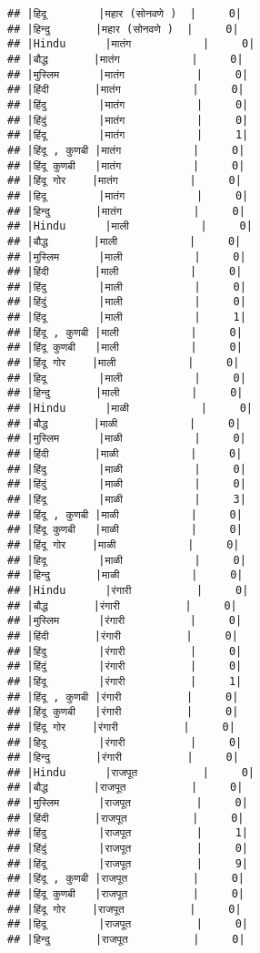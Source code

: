 \documentclass[
]{article}
\begin{document}
\begin{verbatim}
## |हिदू        |महार (सोनवणे )  |     0|
## |हिन्दु       |महार (सोनवणे )  |     0|
## |Hindu      |मातंग           |     0|
## |बौद्ध       |मातंग           |     0|
## |मुस्लिम      |मातंग           |     0|
## |हिंदी       |मातंग           |     0|
## |हिंदु        |मातंग           |     0|
## |हिंदुं        |मातंग           |     0|
## |हिंदू        |मातंग           |     1|
## |हिंदू , कुणबी |मातंग           |     0|
## |हिंदू कुणबी   |मातंग           |     0|
## |हिंदू गोर    |मातंग           |     0|
## |हिदू        |मातंग           |     0|
## |हिन्दु       |मातंग           |     0|
## |Hindu      |माली           |     0|
## |बौद्ध       |माली           |     0|
## |मुस्लिम      |माली           |     0|
## |हिंदी       |माली           |     0|
## |हिंदु        |माली           |     0|
## |हिंदुं        |माली           |     0|
## |हिंदू        |माली           |     1|
## |हिंदू , कुणबी |माली           |     0|
## |हिंदू कुणबी   |माली           |     0|
## |हिंदू गोर    |माली           |     0|
## |हिदू        |माली           |     0|
## |हिन्दु       |माली           |     0|
## |Hindu      |माळी           |     0|
## |बौद्ध       |माळी           |     0|
## |मुस्लिम      |माळी           |     0|
## |हिंदी       |माळी           |     0|
## |हिंदु        |माळी           |     0|
## |हिंदुं        |माळी           |     0|
## |हिंदू        |माळी           |     3|
## |हिंदू , कुणबी |माळी           |     0|
## |हिंदू कुणबी   |माळी           |     0|
## |हिंदू गोर    |माळी           |     0|
## |हिदू        |माळी           |     0|
## |हिन्दु       |माळी           |     0|
## |Hindu      |रंगारी          |     0|
## |बौद्ध       |रंगारी          |     0|
## |मुस्लिम      |रंगारी          |     0|
## |हिंदी       |रंगारी          |     0|
## |हिंदु        |रंगारी          |     0|
## |हिंदुं        |रंगारी          |     0|
## |हिंदू        |रंगारी          |     1|
## |हिंदू , कुणबी |रंगारी          |     0|
## |हिंदू कुणबी   |रंगारी          |     0|
## |हिंदू गोर    |रंगारी          |     0|
## |हिदू        |रंगारी          |     0|
## |हिन्दु       |रंगारी          |     0|
## |Hindu      |राजपूत          |     0|
## |बौद्ध       |राजपूत          |     0|
## |मुस्लिम      |राजपूत          |     0|
## |हिंदी       |राजपूत          |     0|
## |हिंदु        |राजपूत          |     1|
## |हिंदुं        |राजपूत          |     0|
## |हिंदू        |राजपूत          |     9|
## |हिंदू , कुणबी |राजपूत          |     0|
## |हिंदू कुणबी   |राजपूत          |     0|
## |हिंदू गोर    |राजपूत          |     0|
## |हिदू        |राजपूत          |     0|
## |हिन्दु       |राजपूत          |     0|

\end{verbatim}
\end{document}
